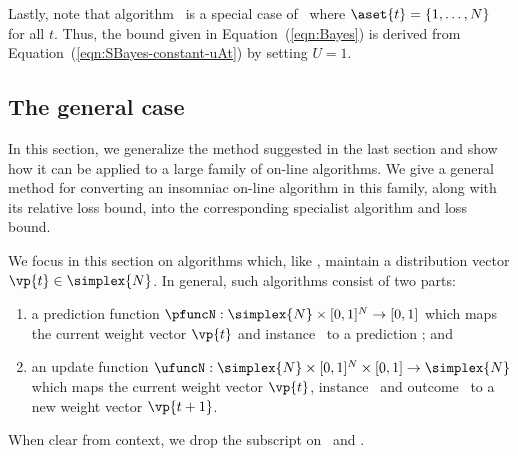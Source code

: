 Lastly, note that algorithm \Bayes\ is a special case of \SBayes\
where $\aset{t} = \{1,\ldots,N\}$ for all $t$. Thus, the bound given in
Equation~(\ref{eqn:Bayes}) is derived from
Equation~(\ref{eqn:SBayes-constant-uAt}) by setting $U=1$.

\subsection{The general case}
\label{sec:gen}

In this section, we generalize the method suggested in the last
section and show how it can be applied to a large family of on-line
algorithms.
We give a general method for converting an insomniac on-line algorithm
in this family, along with its relative loss bound, into the
corresponding specialist algorithm and loss bound.


We focus in this section on algorithms which, like \Bayes, maintain a
distribution vector $\vp{t}\in \simplex{N}$.
In general, such algorithms consist of two parts:
\begin{enumerate}
\item
a prediction function
$\pfuncN: \simplex{N}\times [0,1]^N \rightarrow [0,1]$
which maps the current weight vector $\vp{t}$ and instance
\ to a prediction ; and
\item
an update function
$\ufuncN: \simplex{N}\times [0,1]^N\times [0,1] \rightarrow
  \simplex{N}$
which maps the current weight vector $\vp{t}$, instance
\ and outcome \ to a new weight vector
$\vp{t+1}$.
\end{enumerate}
When clear from context, we drop the subscript on \pfuncN\ and
\ufuncN.

